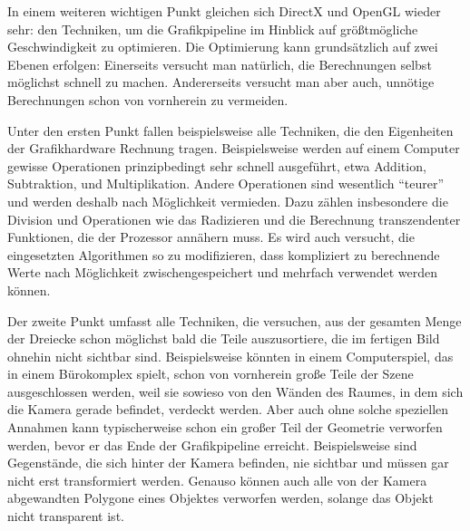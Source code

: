 \label{performance}
In einem weiteren wichtigen Punkt gleichen sich DirectX und OpenGL wieder sehr: den Techniken, um die Grafikpipeline im Hinblick auf größtmögliche Geschwindigkeit zu optimieren. Die Optimierung kann grundsätzlich auf zwei Ebenen erfolgen: Einerseits versucht man natürlich, die Berechnungen selbst möglichst schnell zu machen. Andererseits versucht man aber auch, unnötige Berechnungen schon von vornherein zu vermeiden.

Unter den ersten Punkt fallen beispielsweise alle Techniken, die den Eigenheiten der Grafikhardware Rechnung tragen. Beispielsweise werden auf einem Computer gewisse Operationen prinzipbedingt sehr schnell ausgeführt, etwa Addition, Subtraktion, und Multiplikation. Andere Operationen sind wesentlich \enquote{teurer} und werden deshalb nach Möglichkeit vermieden. Dazu zählen insbesondere die Division und Operationen wie das Radizieren und die Berechnung transzendenter Funktionen, die der Prozessor annähern muss. Es wird auch versucht, die eingesetzten Algorithmen so zu modifizieren, dass kompliziert zu berechnende Werte nach Möglichkeit zwischengespeichert und mehrfach verwendet werden können.

Der zweite Punkt umfasst alle Techniken, die versuchen, aus der gesamten Menge der Dreiecke schon möglichst bald die Teile auszusortiere, die im fertigen Bild ohnehin nicht sichtbar sind. Beispielsweise könnten in einem Computerspiel, das in einem Bürokomplex spielt, schon von vornherein große Teile der Szene ausgeschlossen werden, weil sie sowieso von den Wänden des Raumes, in dem sich die Kamera gerade befindet, verdeckt werden. Aber auch ohne solche speziellen Annahmen kann typischerweise schon ein großer Teil der Geometrie verworfen werden, bevor er das Ende der Grafikpipeline erreicht. Beispielsweise sind Gegenstände, die sich hinter der Kamera befinden, nie sichtbar und müssen gar nicht erst transformiert werden. Genauso können auch alle von der Kamera abgewandten Polygone eines Objektes verworfen werden, solange das Objekt nicht transparent ist.